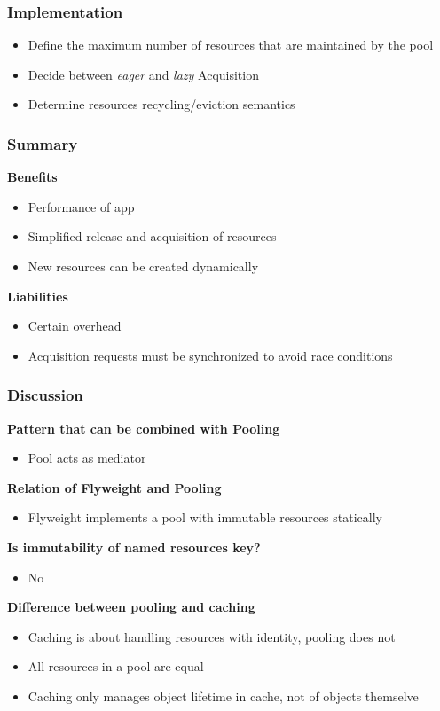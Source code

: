 \subsubsection{Implementation}
\begin{itemize}
    \item Define the maximum number of resources that are maintained by the pool
    \item Decide between \textit{eager} and \textit{lazy} Acquisition
    \item Determine resources recycling/eviction semantics
\end{itemize}
\subsubsection{Summary}
\textbf{Benefits}
\begin{itemize}
    \item Performance of app
    \item Simplified release and acquisition of resources
    \item New resources can be created dynamically
\end{itemize}
\textbf{Liabilities}
\begin{itemize}
    \item Certain overhead
    \item Acquisition requests must be synchronized to avoid race conditions
\end{itemize}
\subsubsection{Discussion}
\textbf{Pattern that can be combined with Pooling}
\begin{itemize}
    \item Pool acts as mediator
\end{itemize}
\textbf{Relation of Flyweight and Pooling}
\begin{itemize}
    \item Flyweight implements a pool with immutable resources statically
\end{itemize}
\textbf{Is immutability of named resources key?}
\begin{itemize}
    \item No
\end{itemize}
\textbf{Difference between pooling and caching}
\begin{itemize}
    \item Caching is about handling resources with identity, pooling does not
    \item All resources in a pool are equal
    \item Caching only manages object lifetime in cache, not of objects themselve
\end{itemize}